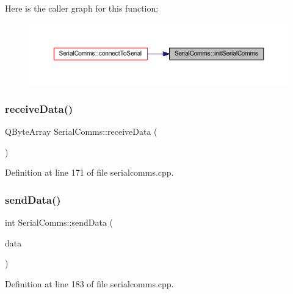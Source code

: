 Here is the caller graph for this function\+:
\nopagebreak
\begin{figure}[H]
\begin{center}
\leavevmode
\includegraphics[width=350pt]{classSerialComms_aacd1dbe02e7eee87c7d75fc2049e71f4_icgraph}
\end{center}
\end{figure}
\mbox{\label{classSerialComms_a27213be37d69250aaedc5c861c2d2200}} 
\subsubsection{\texorpdfstring{receiveData()}{receiveData()}}
{\footnotesize\ttfamily Q\+Byte\+Array Serial\+Comms\+::receive\+Data (\begin{DoxyParamCaption}{ }\end{DoxyParamCaption})}



Definition at line 171 of file serialcomms.\+cpp.

\mbox{\label{classSerialComms_abcbc3cce26ff395684de26a07da7ca26}} 
\subsubsection{\texorpdfstring{sendData()}{sendData()}}
{\footnotesize\ttfamily int Serial\+Comms\+::send\+Data (\begin{DoxyParamCaption}\item[{const Q\+Byte\+Array \&}]{data }\end{DoxyParamCaption})}



Definition at line 183 of file serialcomms.\+cpp.

